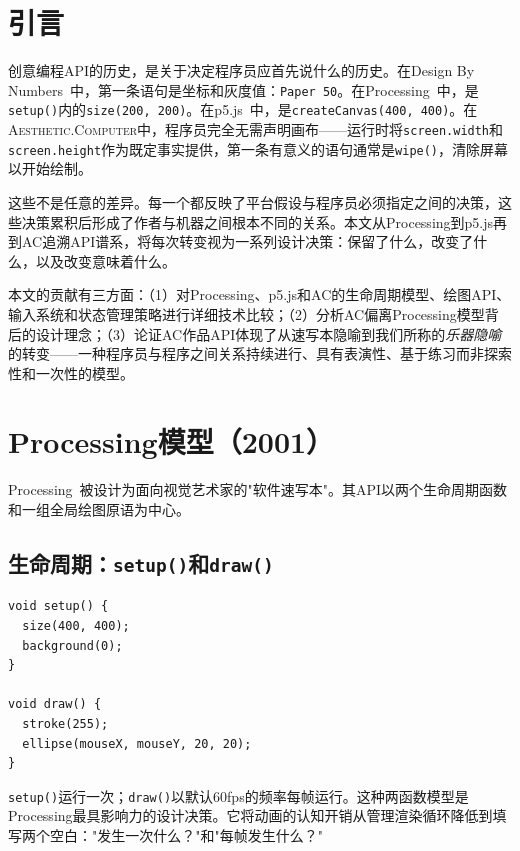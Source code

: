 \documentclass[10pt,letterpaper,twocolumn]{article}
\newcommand{\ac}{\textsc{Aesthetic.Computer}}
\begin{document}

\section{引言}

创意编程API的历史，是关于决定程序员应首先说什么的历史。在Design By Numbers~\citep{maeda2001dbn}中，第一条语句是坐标和灰度值：\texttt{Paper 50}。在Processing~\citep{reas2003processing}中，是\texttt{setup()}内的\texttt{size(200, 200)}。在p5.js~\citep{mccarthy2015p5js}中，是\texttt{createCanvas(400, 400)}。在\ac{}中，程序员完全无需声明画布——运行时将\texttt{screen.width}和\texttt{screen.height}作为既定事实提供，第一条有意义的语句通常是\texttt{wipe()}，清除屏幕以开始绘制。

这些不是任意的差异。每一个都反映了平台假设与程序员必须指定之间的决策，这些决策累积后形成了作者与机器之间根本不同的关系。本文从Processing到p5.js再到AC追溯API谱系，将每次转变视为一系列设计决策：保留了什么，改变了什么，以及改变意味着什么。

本文的贡献有三方面：（1）对Processing、p5.js和AC的生命周期模型、绘图API、输入系统和状态管理策略进行详细技术比较；（2）分析AC偏离Processing模型背后的设计理念；（3）论证AC作品API体现了从速写本隐喻到我们所称的\emph{乐器隐喻}的转变——一种程序员与程序之间关系持续进行、具有表演性、基于练习而非探索性和一次性的模型。


\section{Processing模型（2001）}
\label{sec:processing}

Processing~\citep{reas2007processing}被设计为面向视觉艺术家的"软件速写本"。其API以两个生命周期函数和一组全局绘图原语为中心。

\subsection{生命周期：\texttt{setup()}和\texttt{draw()}}

\begin{lstlisting}[style=processingstyle,caption={最小Processing草图。}]
void setup() {
  size(400, 400);
  background(0);
}

void draw() {
  stroke(255);
  ellipse(mouseX, mouseY, 20, 20);
}
\end{lstlisting}

\texttt{setup()}运行一次；\texttt{draw()}以默认60fps的频率每帧运行。这种两函数模型是Processing最具影响力的设计决策。它将动画的认知开销从管理渲染循环降低到填写两个空白："发生一次什么？"和"每帧发生什么？"
\end{document}
